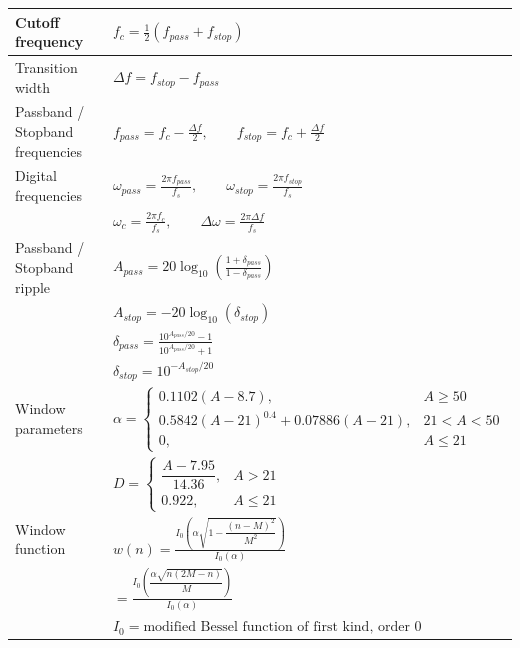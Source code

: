 \begin{center}
\begin{tabular}{|l|l|}
\hline

Cutoff frequency
&
$
f_c
=
\frac12
(f_{pass}+f_{stop})
$
\\
\hline

Transition width
&
$
\Delta f
=
f_{stop}-f_{pass}
$
\\
\hline

Passband / Stopband frequencies
&
$
f_{pass}
=
f_c-\frac{\Delta f}{2},
\qquad
f_{stop}
=
f_c+\frac{\Delta f}{2}
$
\\
\hline

Digital frequencies
&
$
\omega_{pass}
=
\frac{2\pi f_{pass}}{f_s},
\qquad
\omega_{stop}
=
\frac{2\pi f_{stop}}{f_s}
$
\\

&
$
\omega_c
=
\frac{2\pi f_c}{f_s},
\qquad
\Delta\omega
=
\frac{2\pi\Delta f}{f_s}
$
\\
\hline

Passband / Stopband ripple
&
$
A_{pass}
=
20\log_{10}
\left(
\frac{1+\delta_{pass}}
{1-\delta_{pass}}
\right)
$
\\

&
$
A_{stop}
=
-20\log_{10}
(\delta_{stop})
$
\\

&
$
\delta_{pass}
=
\frac
{10^{A_{pass}/20}-1}
{10^{A_{pass}/20}+1}
$
\\

&
$
\delta_{stop}
=
10^{-A_{stop}/20}
$
\\
\hline

Window parameters
&
$
\alpha=
\begin{cases}
0.1102(A-8.7),
&
A\ge50
\\
0.5842(A-21)^{0.4}
+
0.07886(A-21),
&
21<A<50
\\
0,
&
A\le21
\end{cases}
$
\\

&
$
D=
\begin{cases}
\dfrac{A-7.95}{14.36},
&
A>21
\\
0.922,
&
A\le21
\end{cases}
$
\\
\hline

Window function
&
$
w(n)
=
\frac
{
I_0
\left(
\alpha
\sqrt{
1-
\dfrac{(n-M)^2}{M^2}
}
\right)
}
{I_0(\alpha)}
$
\\

&
$
=
\frac
{
I_0
\left(
\dfrac
{\alpha\sqrt{n(2M-n)}}
{M}
\right)
}
{I_0(\alpha)}
$
\\

&
$
I_0
=
\text{modified Bessel function of first kind, order }0
$
\\

\hline
\end{tabular}
\end{center}

